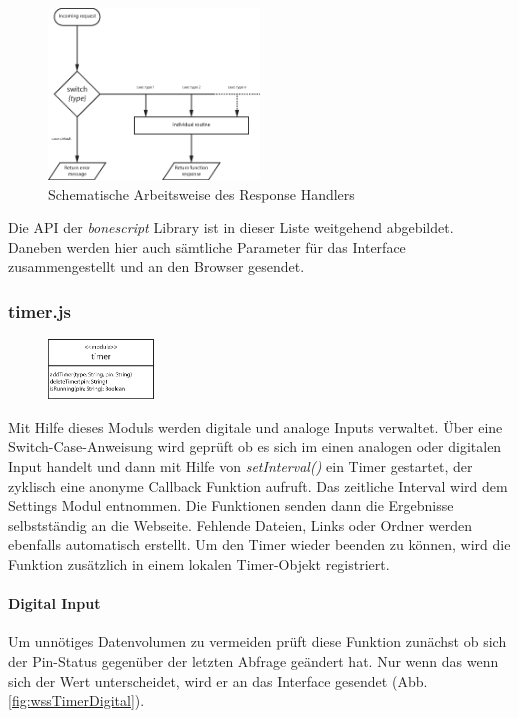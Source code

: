 \begin{figure}[ht]
  \centering
  \includegraphics[width = 0.5\textwidth]{dokumentation/images/wssResponseHandler.eps}
  \caption{Schematische Arbeitsweise des Response Handlers}
  \label{fig:wssResponseHandler}
\end{figure}

Die API der \textit{bonescript} Library ist in dieser Liste weitgehend abgebildet. Daneben werden hier auch sämtliche Parameter für das Interface zusammengestellt und an den Browser gesendet.

\subsubsection{timer.js}
\begin{figure}
  \vspace{-16pt}
  \centering
  \includegraphics[width = 0.25\textwidth]{dokumentation/images/apiTimer.eps}
\end{figure}

Mit Hilfe dieses Moduls werden digitale und analoge Inputs verwaltet. Über eine Switch-Case-Anweisung wird geprüft ob es sich im einen analogen oder digitalen Input handelt und dann mit Hilfe von \textit{setInterval()} ein Timer gestartet, der zyklisch eine anonyme Callback Funktion aufruft. Das zeitliche Interval wird dem Settings Modul entnommen. Die Funktionen senden dann die Ergebnisse selbstständig an die Webseite. Fehlende Dateien, Links oder Ordner werden ebenfalls automatisch erstellt. Um den Timer wieder beenden zu können, wird die Funktion zusätzlich in einem lokalen Timer-Objekt registriert.

\paragraph{Digital Input} Um unnötiges Datenvolumen zu vermeiden prüft diese Funktion zunächst ob sich der Pin-Status gegenüber der letzten Abfrage geändert hat. Nur wenn das wenn sich der Wert unterscheidet, wird er an das Interface gesendet (Abb. \ref{fig:wssTimerDigital}).

